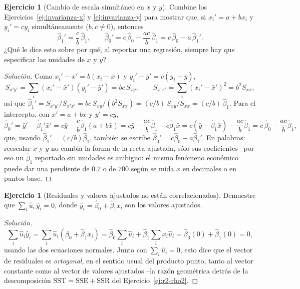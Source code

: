 \documentclass[11pt,a4paper,oneside]{article}
\theoremstyle{plain}
\theoremstyle{definition}
\newtheorem{exercise}[teorema]{Ejercicio}
\begin{document}
\begin{exercise}[Cambio de escala simultáneo en $x$ y $y$]\label{ej:invarianza-combinada}
Combine los Ejercicios~\ref{ej:invarianza-x} y \ref{ej:invarianza-y} para
mostrar que, si $x_i'=a+bx_i$ y $y_i'=cy_i$ simultáneamente
($b,c\neq0$), entonces
\[
  \hat\beta_1' = \frac{c}{b}\,\hat\beta_1, \qquad
  \hat\beta_0' = c\,\hat\beta_0 - \frac{ac}{b}\,\hat\beta_1
  = c\,\hat\beta_0 - a\,\hat\beta_1' .
\]
¿Qué le dice esto sobre por qué, al reportar una regresión, siempre hay
que especificar las unidades de $x$ y $y$?
\end{exercise}
\begin{proof}[Solución]
Como $x_i'-\bar x'=b(x_i-\bar x)$ y $y_i'-\bar y'=c(y_i-\bar y)$,
\[
  S_{x'y'} = \sum_i(x_i'-\bar x')(y_i'-\bar y') = bc\,S_{xy}, \qquad
  S_{x'x'} = \sum_i(x_i'-\bar x')^2 = b^2 S_{xx},
\]
así que
$\hat\beta_1' = S_{x'y'}/S_{x'x'} = bc\,S_{xy}/(b^2S_{xx}) =
(c/b)\,S_{xy}/S_{xx} = (c/b)\,\hat\beta_1$. Para el intercepto, con
$\bar x'=a+b\bar x$ y $\bar y'=c\bar y$,
\[
  \hat\beta_0' = \bar y'-\hat\beta_1'\bar x'
  = c\bar y - \frac{c}{b}\hat\beta_1(a+b\bar x)
  = c\bar y - \frac{ac}{b}\hat\beta_1 - c\hat\beta_1\bar x
  = c(\bar y-\hat\beta_1\bar x) - \frac{ac}{b}\hat\beta_1
  = c\,\hat\beta_0 - \frac{ac}{b}\hat\beta_1,
\]
que, usando $\hat\beta_1'=(c/b)\hat\beta_1$, también se escribe
$\hat\beta_0'=c\hat\beta_0-a\hat\beta_1'$. En palabras: reescalar $x$ y
$y$ no cambia la forma de la recta ajustada, sólo sus coeficientes --por
eso un $\hat\beta_1$ reportado sin unidades es ambiguo: el mismo
fenómeno económico puede dar una pendiente de $0.7$ o de $700$ según se
mida $x$ en decimales o en puntos base.
\end{proof}

\begin{exercise}[Residuales y valores ajustados no están correlacionados]\label{ej:ortog-fitted}
Demuestre que $\sum_i \hat u_i\,\hat y_i = 0$, donde
$\hat y_i=\hat\beta_0+\hat\beta_1x_i$ son los valores ajustados.
\end{exercise}
\begin{proof}[Solución]
\[
  \sum_i \hat u_i\hat y_i = \sum_i \hat u_i(\hat\beta_0+\hat\beta_1x_i)
  = \hat\beta_0\sum_i\hat u_i + \hat\beta_1\sum_i x_i\hat u_i
  = \hat\beta_0(0)+\hat\beta_1(0) = 0,
\]
usando las dos ecuaciones normales. Junto con $\sum_i\hat u_i=0$, esto
dice que el vector de residuales es \emph{ortogonal}, en el sentido
usual del producto punto, tanto al vector constante como al vector de
valores ajustados --la razón geométrica detrás de la descomposición
$\mathrm{SST}=\mathrm{SSE}+\mathrm{SSR}$ del
Ejercicio~\ref{ej:r2-rho2}.
\end{proof}
\end{document}

